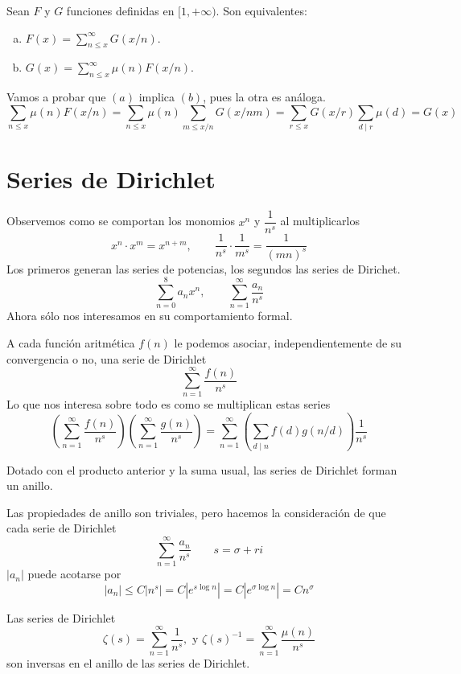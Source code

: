 \documentclass[TAN.tex]{subfiles}
\begin{document}
\begin{prop}
Sean $F$ y $G$ funciones definidas en $[1,+∞)$. Son equivalentes:
\begin{enumerate}[(a)]
\item $F(x) = \sum_{n\leq x}^{∞} G(x/n)$.
\item $G(x) = \sum_{n\leq x}^{∞} μ(n) F(x/n)$.
\end{enumerate}
\begin{dem}
Vamos a probar que $(a)$ implica $(b)$, pues la otra es análoga.
$$
\sum_{n\leq x} μ(n) F(x/n) = \sum_{n\leq x} μ(n) \sum_{m\leq x/n} G(x/nm) = \sum_{r\leq x} G(x/r) \sum_{d\mid r} \mu(d) = G(x)
$$
\end{dem}
\end{prop}
\section{Series de Dirichlet}

Observemos como se comportan los monomios $x^n$ y $\dfrac{1}{n^s}$ al multiplicarlos
\[ x^n \cdot x^m = x^{n+m}, \qquad \frac{1}{n^s} \cdot \frac{1}{m^s} = \frac{1}{(mn)^s} \]
Los primeros generan las series de potencias, los segundos las series de Dirichet.
\[ \sum_{n=0}^{8} a_n x^n, \qquad \sum_{n=1}^{∞} \frac{a_n}{n^s} \]
Ahora sólo nos interesamos en su comportamiento formal.

A cada función aritmética $f(n)$ le podemos asociar, independientemente de su convergencia o no, una serie de Dirichlet
\[ \sum_{n=1}^{∞} \frac{f(n)}{n^s} \]
Lo que nos interesa sobre todo es como se multiplican estas series
\[ \left(\sum_{n=1}^{∞} \frac{f(n)}{n^s}\right)\left(\sum_{n=1}^{∞} \frac{g(n)}{n^s}\right) = \sum_{n=1}^{∞}\left(\sum_{d\mid n} f(d) g(n/d)\right) \frac{1}{n^s}\]

\begin{prop}
Dotado con el producto anterior y la suma usual, las series de Dirichlet forman un anillo.
\end{prop}
\begin{dem}
Las propiedades de anillo son triviales, pero hacemos la consideración de que cada serie de Dirichlet 
$$\sum_{n=1}^{∞} \frac{a_n}{n^s} \qquad s = \sigma + ri
$$
$|a_n|$ puede acotarse por
$$
|a_n| \leq C|n^s|=C|e^{s\log n}|= C|e^{\sigma \log n}| = Cn^\sigma
$$
\end{dem}
\begin{prop}
Las series de Dirichlet
\[ ζ(s) = \sum_{n=1}^{∞} \frac{1}{n^s}, \text{ y } ζ(s)^{-1}=\sum_{n=1}^{∞} \frac{μ(n)}{n^s} \]
son inversas en el anillo de las series de Dirichlet.
\end{prop}
\end{document}
